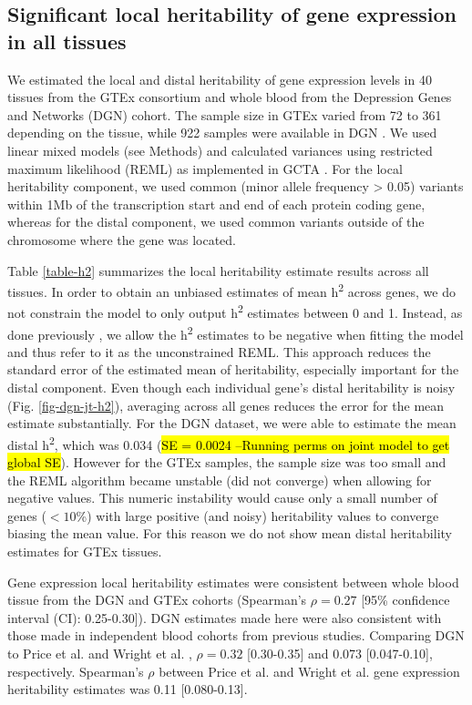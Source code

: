 \documentclass[10pt,letterpaper]{article}
\begin{document}
\subsection*{Significant local heritability of gene expression in all tissues}\label{local-genetic-variation-can-be-well-characterized-for-all-tissues}

We estimated the local and distal heritability of gene expression levels in 40 tissues from the GTEx consortium and whole blood from the Depression Genes and Networks (DGN) cohort. The sample size in GTEx varied from 72 to 361 depending on the tissue, while 922 samples were available in DGN \cite{Battle_2013}. We used linear mixed models (see Methods) and calculated variances using restricted maximum likelihood (REML) as implemented in GCTA \cite{Yang_2011}. For the local heritability component, we used common (minor allele frequency \textgreater{} 0.05) variants within 1Mb of the transcription start and end of each protein coding gene, whereas for the distal component, we used common variants outside of the chromosome where the gene was located.

Table \ref{table-h2} summarizes the local heritability estimate results across all tissues. In order to obtain an unbiased estimates of mean h\textsuperscript{2} across genes, we do not constrain the model to only output h\textsuperscript{2} estimates between 0 and 1. Instead, as done previously \cite{Price_2011,Wright_2014}, we allow the h\textsuperscript{2} estimates to be negative when fitting the model and thus refer to it as the unconstrained REML. This approach reduces the standard error of the estimated mean of heritability, especially important for the distal component. Even though each individual gene's distal heritability is noisy (Fig. \ref{fig-dgn-jt-h2}), averaging across all genes reduces the error for the mean estimate substantially. For the DGN dataset, we were able to estimate the mean distal h\textsuperscript{2}, which was 0.034 (\hl{SE = 0.0024 --Running perms on joint model to get global SE}). However for the GTEx samples, the sample size was too small and the REML algorithm became unstable (did not converge) when allowing for negative values. This numeric instability would cause only a small number of genes ($<10$\%) with large positive (and noisy) heritability values to converge biasing the mean value. For this reason we do not show mean distal heritability estimates for GTEx tissues. 

Gene expression local heritability estimates were consistent between whole blood tissue from the DGN and GTEx cohorts (Spearman's $\rho = 0.27$ [95\% confidence interval (CI): 0.25-0.30]). DGN estimates made here were also consistent with those made in independent blood cohorts from previous studies. Comparing DGN to Price et al. \cite{Price_2011} and Wright et al. \cite{Wright_2014}, $\rho = 0.32$ [0.30-0.35] and 0.073 [0.047-0.10], respectively. Spearman's $\rho$ between Price et al. \cite{Price_2011} and Wright et al. \cite{Wright_2014} gene expression heritability estimates was 0.11 [0.080-0.13].
\end{document}

